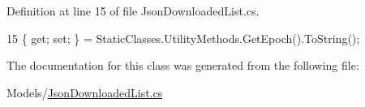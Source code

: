 Definition at line 15 of file Json\+Downloaded\+List.\+cs.


\begin{DoxyCode}
15 \{ \textcolor{keyword}{get}; \textcolor{keyword}{set}; \} = StaticClasses.UtilityMethods.GetEpoch().ToString();
\end{DoxyCode}


The documentation for this class was generated from the following file\+:\begin{DoxyCompactItemize}
\item 
Models/\mbox{\hyperlink{_json_downloaded_list_8cs}{Json\+Downloaded\+List.\+cs}}\end{DoxyCompactItemize}
